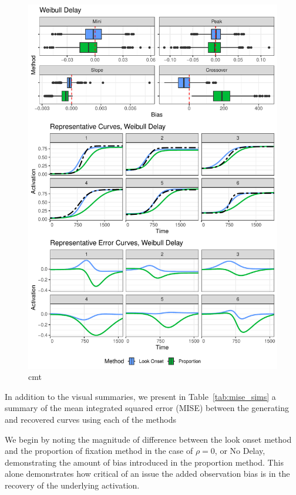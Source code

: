\documentclass{article}
\begin{document}
\begin{figure}[H]
\centering
\includegraphics{rep_and_diff_weibull_delay.pdf}
\caption{cmt}
\label{fig:panel_weibull_delay}
\end{figure}



In addition to the visual summaries, we present in Table~\ref{tab:mise_sims} a summary of the mean integrated squared error (MISE) between the generating and recovered curves using each of the methods

We begin by noting the  magnitude of difference between the look onset method and the proportion of fixation method in the case of $\rho = 0$, or No Delay, demonstrating the amount of bias introduced in the proportion method. This alone demonstrates how critical of an issue the added observation bias is in the recovery of the underlying activation.
\end{document}
